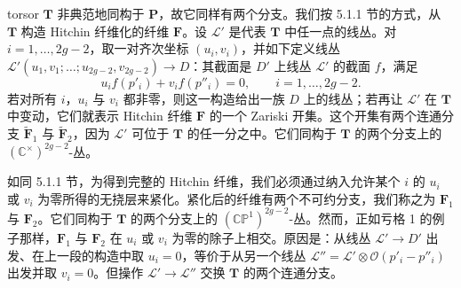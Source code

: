 

torsor $\boldsymbol{T}$ 非典范地同构于 $\boldsymbol{P}$，故它同样有两个分支。我们按 5.1.1 节的方式，从 $\boldsymbol{T}$ 构造 Hitchin 纤维化的纤维 $\boldsymbol{F}$。设 $\mathcal{L}'$ 是代表 $\boldsymbol{T}$ 中任一点的线丛。对 $i=1,\dots,2g-2$，取一对齐次坐标 $(u_i,v_i)$，并如下定义线丛 $\mathcal{L}'(u_1,v_1;\dots;u_{2g-2},v_{2g-2})\to D$：其截面是 $D'$ 上线丛 $\mathcal{L}'$ 的截面 $f$，满足
\begin{equation}\tag{5.13}
u_i f(p'_i) + v_i f(p''_i) = 0,\qquad i = 1,\dots,2g-2.
\end{equation}
若对所有 $i$，$u_i$ 与 $v_i$ 都非零，则这一构造给出一族 $D$ 上的线丛；若再让 $\mathcal{L}'$ 在 $\boldsymbol{T}$ 中变动，它们就表示 Hitchin 纤维 $\boldsymbol{F}$ 的一个 Zariski 开集。这个开集有两个连通分支 $\widetilde{\boldsymbol{F}}_1$ 与 $\widetilde{\boldsymbol{F}}_2$，因为 $\mathcal{L}'$ 可位于 $\boldsymbol{T}$ 的任一分之中。它们同构于 $\boldsymbol{T}$ 的两个分支上的 $(\mathbb{C}^\times)^{2g-2}$-丛。

如同 5.1.1 节，为得到完整的 Hitchin 纤维，我们必须通过纳入允许某个 $i$ 的 $u_i$ 或 $v_i$ 为零所得的无挠层来紧化。紧化后的纤维有两个不可约分支，我们称之为 $\boldsymbol{F}_1$ 与 $\boldsymbol{F}_2$。它们同构于 $\boldsymbol{T}$ 的两个分支上的 $(\mathbb{CP}^1)^{2g-2}$-丛。然而，正如亏格 1 的例子那样，$\boldsymbol{F}_1$ 与 $\boldsymbol{F}_2$ 在 $u_i$ 或 $v_i$ 为零的除子上相交。原因是：从线丛 $\mathcal{L}'\to D'$ 出发、在上一段的构造中取 $u_i=0$，等价于从另一个线丛 $\mathcal{L}'' = \mathcal{L}'\otimes\mathcal{O}(p'_i-p''_i)$ 出发并取 $v_i=0$。但操作 $\mathcal{L}'\to\mathcal{L}''$ 交换 $\boldsymbol{T}$ 的两个连通分支。


